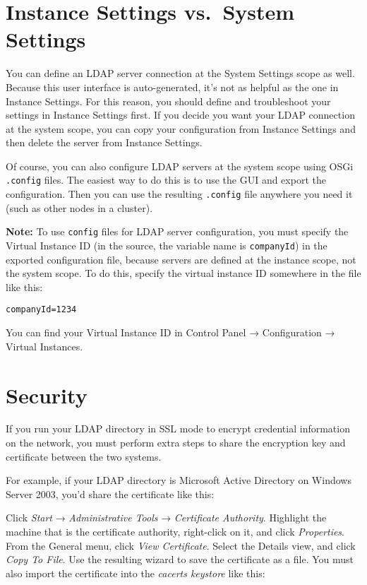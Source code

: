 \section{Instance Settings vs.~System
Settings}\label{instance-settings-vs.-system-settings}

You can define an LDAP server connection at the System Settings scope as
well. Because this user interface is auto-generated, it's not as helpful
as the one in Instance Settings. For this reason, you should define and
troubleshoot your settings in Instance Settings first. If you decide you
want your LDAP connection at the system scope, you can copy your
configuration from Instance Settings and then delete the server from
Instance Settings.

Of course, you can also configure LDAP servers at the system scope using
OSGi \texttt{.config} files. The easiest way to do this is to use the
GUI and export the configuration. Then you can use the resulting
\texttt{.config} file anywhere you need it (such as other nodes in a
cluster).

\textbf{Note:} To use \texttt{config} files for LDAP server
configuration, you must specify the Virtual Instance ID (in the source,
the variable name is \texttt{companyId}) in the exported configuration
file, because servers are defined at the instance scope, not the system
scope. To do this, specify the virtual instance ID somewhere in the file
like this:

\begin{verbatim}
companyId=1234
\end{verbatim}

You can find your Virtual Instance ID in Control Panel → Configuration →
Virtual Instances.

\section{Security}\label{security}

If you run your LDAP directory in SSL mode to encrypt credential
information on the network, you must perform extra steps to share the
encryption key and certificate between the two systems.

For example, if your LDAP directory is Microsoft Active Directory on
Windows Server 2003, you'd share the certificate like this:

Click \emph{Start} → \emph{Administrative Tools} → \emph{Certificate
Authority}. Highlight the machine that is the certificate authority,
right-click on it, and click \emph{Properties}. From the General menu,
click \emph{View Certificate}. Select the Details view, and click
\emph{Copy To File}. Use the resulting wizard to save the certificate as
a file. You must also import the certificate into the \emph{cacerts
keystore} like this:

